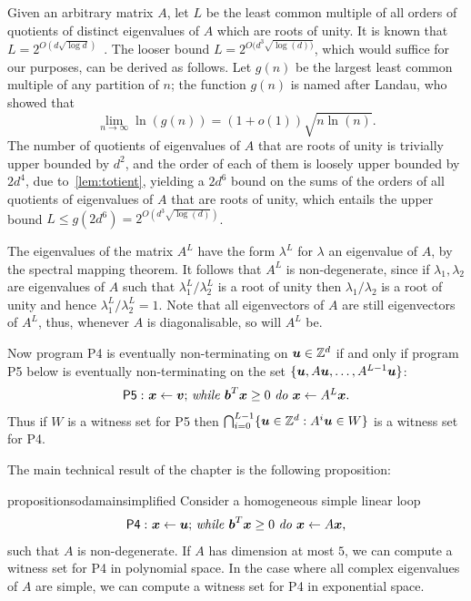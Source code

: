 Given an arbitrary matrix $A$, let $L$ be the least common multiple of
all orders of quotients of distinct eigenvalues of $A$ which are roots
of unity. It is known that $L=2^{O(d\sqrt{\log d})}$~\cite{BOOK}.
The looser bound $L = 2^{O(d^{3} \sqrt{\log(d))}}$, which would suffice
for our purposes, can be derived as follows.
Let $g(n)$ be the largest least common multiple of any partition of $n$;
the function $g(n)$ is named after Landau, who showed that
\[ \lim\limits_{n \rightarrow \infty} \ln(g(n)) = (1+o(1)) \sqrt{n \ln(n)} . \]
The number of quotients of eigenvalues of $A$ that are roots of unity is
trivially upper bounded by $d^{2}$, and the order of each of them is
loosely upper bounded by $2d^{4}$, due to~\cref{lem:totient}, yielding
a $2d^{6}$ bound on the sums of the orders of all quotients of eigenvalues
of $A$ that are roots of unity, which entails the upper bound
$L \leq g(2d^{6}) = 2^{O(d^{3} \sqrt{\log(d)})}$.

The eigenvalues of the matrix $A^L$ have the form $\lambda^L$ for
$\lambda$ an eigenvalue of $A$, by the spectral mapping theorem.  It follows that
$A^L$ is non-degenerate, since if $\lambda_1,\lambda_2$ are
eigenvalues of $A$ such that $\lambda^L_1/\lambda^L_2$ is a root of
unity then $\lambda_1/\lambda_2$ is a root of unity and hence
$\lambda^L_1/\lambda^L_2=1$.
Note that all eigenvectors of $A$ are still eigenvectors of $A^L$,
thus, whenever $A$ is diagonalisable, so will $A^L$ be.

Now program \textsf{P4} is eventually non-terminating on
$\boldsymbol{u}\in \mathbb{Z}^{d}$ if and only if program \textsf{P5}
below is eventually non-terminating on the set
$\lbrace \boldsymbol{u},A\boldsymbol{u}, \ldots,A^{L-1}\boldsymbol{u}\rbrace$:
\begin{gather*}
\mathsf{P5:}\ \mbox{$\boldsymbol{x}\gets \boldsymbol{v}$;
\textit{while} $\boldsymbol b^T\boldsymbol{x} \geq 0$ \textit{do} $\boldsymbol{x}\leftarrow A^L\boldsymbol{x}$.}
\end{gather*}
Thus if $W$ is a witness set for \textsf{P5} then $\bigcap_{i=0}^{L-1}
\lbrace \boldsymbol{u} \in \mathbb{Z}^{d} : A^i\boldsymbol{u} \in W\rbrace$ is a witness set for
\textsf{P4}.

The main technical result of the chapter is the following proposition:
\begin{restatable}{proposition}{sodamainsimplified}
\label{prop:soda-main-simplified}
Consider a homogeneous simple linear loop
\begin{gather*}
\mathsf{P4:}\ \mbox{$\boldsymbol{x}\gets \boldsymbol{u}$;
\textit{while} $\boldsymbol{b}^T\boldsymbol{x} \geq 0$ \textit{do} $\boldsymbol{x}\leftarrow A\boldsymbol{x}$,}
\end{gather*}
such that $A$ is non-degenerate. If $A$ has dimension at most $5$, we can compute a witness set for \textsf{P4} in polynomial space.
In the case where all complex eigenvalues of $A$ are simple, we can compute a witness set for \textsf{P4} in exponential space.
\end{restatable}

